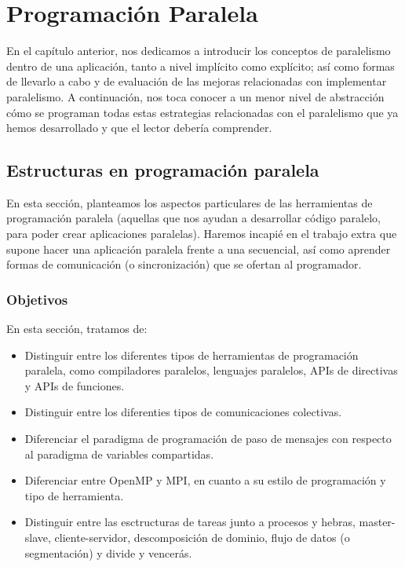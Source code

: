 \chapter{Programación Paralela}

En el capítulo anterior, nos dedicamos a introducir los conceptos de paralelismo dentro de una aplicación, tanto a nivel implícito como explícito; así como formas de llevarlo a cabo y de evaluación de las mejoras relacionadas con implementar paralelismo. A continuación, nos toca conocer a un menor nivel de abstracción cómo se programan todas estas estrategias relacionadas con el paralelismo que ya hemos desarrollado y que el lector debería comprender.

\section{Estructuras en programación paralela}
En esta sección, planteamos los aspectos particulares de las herramientas de programación paralela (aquellas que nos ayudan a desarrollar código paralelo, para poder crear aplicaciones paralelas). Haremos incapié en el trabajo extra que supone hacer una aplicación paralela frente a una secuencial, así como aprender formas de comunicación (o sincronización) que se ofertan al programador.

\subsection{Objetivos}
En esta sección, tratamos de:
\begin{itemize}
    \item Distinguir entre los diferentes tipos de herramientas de programación paralela, como compiladores paralelos, lenguajes paralelos, APIs de directivas y APIs de funciones.
    \item Distinguir entre los diferenties tipos de comunicaciones colectivas.
    \item Diferenciar el paradigma de programación de paso de mensajes con respecto al paradigma de variables compartidas.
    \item Diferenciar entre OpenMP y MPI, en cuanto a su estilo de programación y tipo de herramienta.
    \item Distinguir entre las esctructuras de tareas junto a procesos y hebras, master-slave, cliente-servidor, descomposición de dominio, flujo de datos (o segmentación) y divide y vencerás.
\end{itemize}

